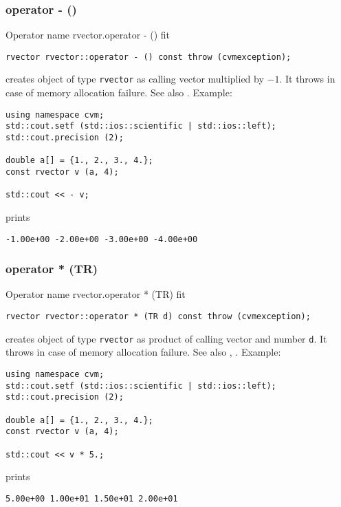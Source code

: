 \subsubsection{operator - ()}
Operator%
\pdfdest name {rvector.operator - ()} fit
\begin{verbatim}
rvector rvector::operator - () const throw (cvmexception);
\end{verbatim}
creates  object of type \verb"rvector" as
calling vector multiplied by $-1$.
It throws  
in case of memory allocation failure.
See also .
Example:
\begin{Verbatim}
using namespace cvm;
std::cout.setf (std::ios::scientific | std::ios::left); 
std::cout.precision (2);

double a[] = {1., 2., 3., 4.};
const rvector v (a, 4);

std::cout << - v;
\end{Verbatim}
prints
\begin{Verbatim}
-1.00e+00 -2.00e+00 -3.00e+00 -4.00e+00
\end{Verbatim}
\newpage


\subsubsection{operator * (TR)}
Operator%
\pdfdest name {rvector.operator * (TR)} fit
\begin{verbatim}
rvector rvector::operator * (TR d) const throw (cvmexception);
\end{verbatim}
creates  object of type \verb"rvector" as  product of
calling vector and number \verb"d".
It throws  
in case of memory allocation failure.
See also ,
.
Example:
\begin{Verbatim}
using namespace cvm;
std::cout.setf (std::ios::scientific | std::ios::left); 
std::cout.precision (2);

double a[] = {1., 2., 3., 4.};
const rvector v (a, 4);

std::cout << v * 5.;
\end{Verbatim}
prints
\begin{Verbatim}
5.00e+00 1.00e+01 1.50e+01 2.00e+01
\end{Verbatim}
\newpage


